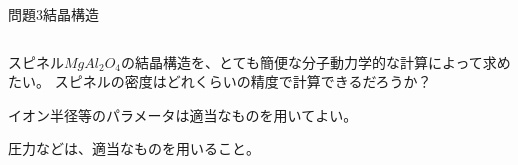 \documentclass[dvipdfmx]{beamer}
\newenvironment{wideitemize}{\itemize\setlength{\itemsep}{1em}}{\enditemize}
\newenvironment{wideitemize2}{\itemize\setlength{\itemsep}{0.2em}}{\enditemize}
\begin{document}

\begin{frame}{問題3}{結晶構造}
\begin{columns}[t]
\begin{column}{0.7\textwidth}
\begin{wideitemize}
	\item スピネル$Mg Al_2 O_4$の結晶構造を、とても簡便な分子動力学的な計算によって求めたい。
	スピネルの密度はどれくらいの精度で計算できるだろうか？
	\begin{wideitemize2}
		\item イオン半径等のパラメータは適当なものを用いてよい。
		\item 圧力などは、適当なものを用いること。
	\end{wideitemize2}

\end{wideitemize}


\end{column}
\end{columns}
\end{frame}
\end{document}
